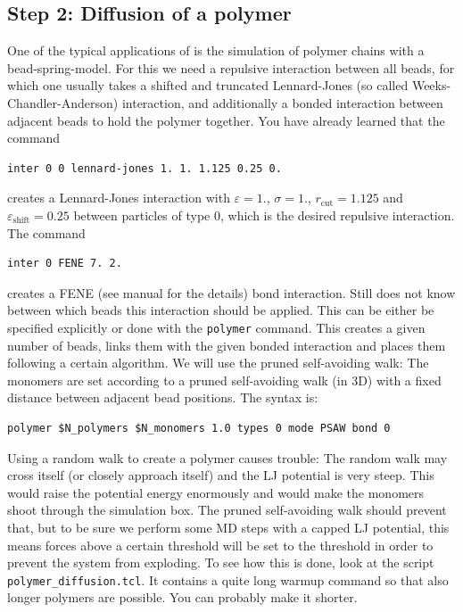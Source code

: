 \subsection{Step 2: Diffusion of a polymer}
One of the typical applications of \ES{} is the simulation of polymer chains 
with a bead-spring-model. For this we need a repulsive interaction
between all beads, for which one usually takes a shifted and truncated
Lennard-Jones (so called Weeks-Chandler-Anderson) interaction, 
and additionally a bonded interaction between 
adjacent beads to hold the polymer together. You have already learned
that the command
{\vspace{0,2cm}\small
\begin{lstlisting}[numbers=none]
inter 0 0 lennard-jones 1. 1. 1.125 0.25 0. 
\end{lstlisting}\vspace{0,2cm}
}
creates a Lennard-Jones interaction with $\varepsilon=1.$, $\sigma=1.$,
$r_\text{cut} = 1.125$ and $\varepsilon_\text{shift}=0.25$ between particles
of type 0, which is the desired 
repulsive interaction. The command
{\vspace{0,2cm}\small
\begin{lstlisting}[numbers=none]
inter 0 FENE 7. 2. 
\end{lstlisting}\vspace{0,2cm}
}
creates a FENE (see \ES{} manual for the details) bond interaction. Still \ES{}
does not know between which beads this interaction should be applied.
This can be either be specified explicitly or done with the \lstinline|polymer|
command. This creates a given number of beads, links them with the given
bonded interaction and places them following a certain algorithm. We will
use the pruned self-avoiding walk: The monomers are set according 
to a pruned self-avoiding walk (in 3D) with a
fixed distance between adjacent bead positions. The syntax is:
{\vspace{0,2cm}\small
\begin{lstlisting}[numbers=none]
polymer $N_polymers $N_monomers 1.0 types 0 mode PSAW bond 0 
\end{lstlisting}\vspace{0,2cm}
}
Using a random walk to create a polymer causes trouble: The random walk may 
cross itself (or closely approach itself) and the LJ potential is very
steep. This would raise the potential energy enormously and would make
the monomers shoot through the simulation box. The pruned self-avoiding
walk should prevent that, but to be sure
we perform some MD steps with a capped LJ potential, this means 
forces above a certain threshold will be set to the threshold in order to prevent
the system from exploding. To see how this is done, look at the script 
\texttt{polymer\_diffusion.tcl}.
It contains a quite long warmup command so that also longer polymers
are possible. You can probably make it shorter.

